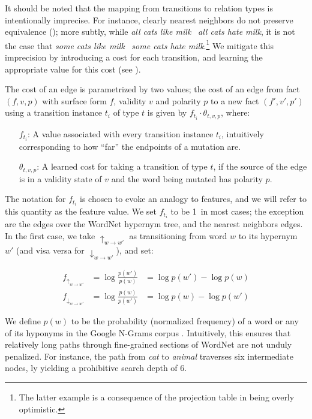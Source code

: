 It should be noted that the mapping from transitions to relation
  types is intentionally imprecise.
For instance, clearly nearest neighbors do not preserve equivalence
  (\equivalent); more subtly, while
  \textit{all cats like milk} \alternate\ \textit{all cats hate milk},
  it is not the case that
  \textit{some cats like milk} \alternate\ \textit{some cats hate milk}.\footnote{
    The latter example is a consequence of the projection table in
     being overly optimistic.
  }
We mitigate this imprecision by introducing a cost for each transition,
  and learning the appropriate value for this cost
  (see ).

The cost of an edge is parametrized by two values; the cost of an edge
  from fact $(f,v,p)$ with surface form $f$, validity
  $v$ and polarity $p$ to a new fact $(f',v',p')$ using a transition
  instance $t_i$ of type $t$ is given by
  $f_{t_i} \cdot \theta_{t,v,p}$, where:

\begin{itemize}
  \indentitem\item[$f_{t_i}$:]
    A value associated with every transition instance $t_i$, intuitively
      corresponding to how ``far'' the endpoints of a mutation are.
  \indentitem\item[$\theta_{t,v,p}$:]
    A learned cost for taking a transition of type $t$, if the source
    of the edge is in a validity state of $v$ and the word being mutated
    has polarity $p$.
\end{itemize}

The notation for $f_{t_i}$ is chosen to evoke an analogy to features,
  and we will refer to this quantity as the feature value.
We set $f_{t_i}$ to be 1\ in most cases;
  the exception are the edges over the WordNet hypernym tree,
  and the nearest neighbors edges.
In the first case, we take $\uparrow_{w \rightarrow w'}$ as transitioning
  from word $w$ to its hypernym $w'$ (and visa versa for
  $\downarrow_{w \rightarrow w'}$), and set:

\begin{align*}
  f_{\uparrow_{w \rightarrow w'}}   &= \log \frac{p(w')}{p(w)} &= \log p(w') - \log p(w) \\
  f_{\downarrow_{w \rightarrow w'}} &= \log \frac{p(w)}{p(w')} &= \log p(w) - \log p(w')
\end{align*}

We define $p(w)$ to be the probability (normalized frequency)
  of a word or any of its hyponyms in the Google N-Grams corpus
  \cite{key:2006brants-ngrams}.
Intuitively, this ensures that relatively long paths through fine-grained
  sections of WordNet are not unduly penalized.
For instance, the path from \textit{cat} to \textit{animal} traverses
  six intermediate nodes, \naive ly yielding a prohibitive
  search depth of 6.


